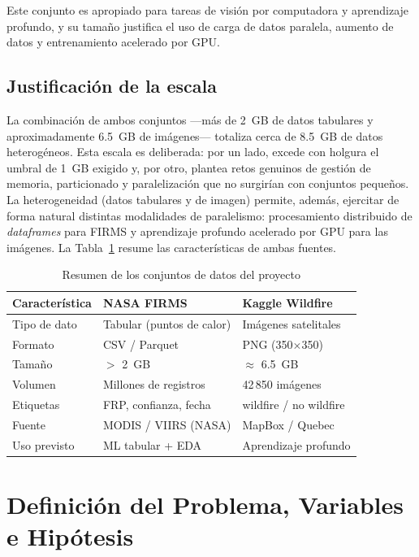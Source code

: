 Este conjunto es apropiado para tareas de visión por computadora y aprendizaje profundo, y su tamaño justifica el uso de carga de datos paralela, aumento de datos y entrenamiento acelerado por GPU.

\subsection{Justificación de la escala}
La combinación de ambos conjuntos —más de 2~GB de datos tabulares y aproximadamente 6.5~GB de imágenes— totaliza cerca de 8.5~GB de datos heterogéneos. Esta escala es deliberada: por un lado, excede con holgura el umbral de 1~GB exigido y, por otro, plantea retos genuinos de gestión de memoria, particionado y paralelización que no surgirían con conjuntos pequeños. La heterogeneidad (datos tabulares y de imagen) permite, además, ejercitar de forma natural distintas modalidades de paralelismo: procesamiento distribuido de \textit{dataframes} para FIRMS y aprendizaje profundo acelerado por GPU para las imágenes. La Tabla~\ref{tab:datasets} resume las características de ambas fuentes.

\begin{table}[t]
\caption{Resumen de los conjuntos de datos del proyecto}
\label{tab:datasets}
\centering
\renewcommand{\arraystretch}{1.3}
\begin{tabular}{p{2.4cm} p{2.5cm} p{2.5cm}}
\toprule
\textbf{Característica} & \textbf{NASA FIRMS} & \textbf{Kaggle Wildfire} \\
\midrule
Tipo de dato & Tabular (puntos de calor) & Imágenes satelitales \\
Formato & CSV / Parquet & PNG (350$\times$350) \\
Tamaño & $>$ 2~GB & $\approx$ 6.5~GB \\
Volumen & Millones de registros & 42\,850 imágenes \\
Etiquetas & FRP, confianza, fecha & wildfire / no wildfire \\
Fuente & MODIS / VIIRS (NASA) & MapBox / Quebec \\
Uso previsto & ML tabular + EDA & Aprendizaje profundo \\
\bottomrule
\end{tabular}
\end{table}

\section{Definición del Problema, Variables e Hipótesis}
\label{sec:problema}

